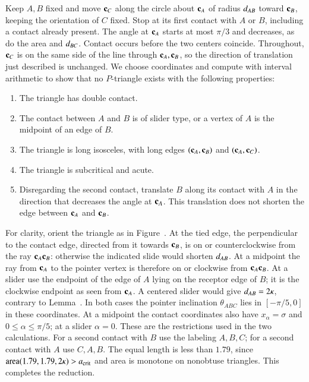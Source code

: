Keep $A,B$ fixed and move ${\mathbf c}_C$ along the circle about ${\mathbf c}_A$
of radius $d_{AB}$ toward ${\mathbf c}_B$, keeping the orientation of $C$
fixed. Stop at its first contact with $A$ or $B$, including a contact
already present. The angle at ${\mathbf c}_A$ starts at most $\pi/3$ and
decreases, as do the area and $d_{BC}$. Contact occurs before the
two centers coincide. Throughout, ${\mathbf c}_C$ is on the same side of
the line through ${\mathbf c}_A,{\mathbf c}_B$, so the direction of translation just
described is unchanged.
 We choose coordinates and
compute with interval
arithmetic to show that no $P$-triangle exists with the
following properties:
\begin{enumerate}
\item The triangle has double contact.
\item The contact between $A$ and $B$ is
  of slider type, or a vertex of $A$ is the midpoint of an edge of $B$.
\item The triangle is long isosceles, with long edges $({\mathbf c}_A,{\mathbf c}_B)$ and $({\mathbf c}_A,{\mathbf c}_C)$.
\item The triangle is subcritical and acute.
\item Disregarding the second contact, translate $B$ along its contact with
  $A$ in the direction that decreases the angle at ${\mathbf c}_A$. This translation
  does not shorten the edge between ${\mathbf c}_A$ and ${\mathbf c}_B$.
\end{enumerate}
For clarity, orient the triangle as in Figure~.
At the tied edge, the perpendicular to the contact edge, directed from
it towards ${\mathbf c}_B$, is on or counterclockwise from the ray
${\mathbf c}_A{\mathbf c}_B$: otherwise the indicated slide would shorten $d_{AB}$.
At a midpoint the ray from ${\mathbf c}_A$ to the pointer vertex is therefore
on or clockwise from ${\mathbf c}_A{\mathbf c}_B$. At a slider use the endpoint of the
edge of $A$ lying on the receptor edge of $B$; it is the clockwise
endpoint as seen from ${\mathbf c}_A$. A centered slider would give
$d_{AB}=2\kappa$, contrary to Lemma~.
In both cases the pointer inclination $\theta_{ABC}$ lies in
$[-\pi/5,0]$ in these coordinates. At a midpoint the contact
coordinates also have $x_\alpha=\sigma$ and $0\le\alpha\le\pi/5$;
at a slider $\alpha=0$. These are the restrictions used in the two
calculations. For a second contact with $B$ use the labeling $A,B,C$;
for a second contact with $A$ use $C,A,B$. The equal length is less
than $1.79$, since ${\operatorname{area}}(1.79,1.79,2\kappa)>a_\text{crit}$ and area is
monotone on nonobtuse triangles. This completes the reduction.

